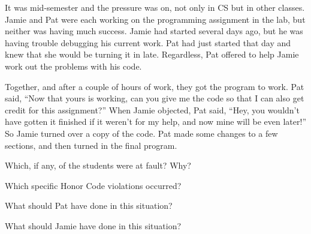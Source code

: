 
It was mid-semester and the pressure was on, not only in CS but in other classes.
Jamie and Pat were each working on the programming assignment in the lab, but neither was having much success.
Jamie had started several days ago, but he was having trouble debugging his current work.
Pat had just started that day and knew that she would be turning it in late.
Regardless, Pat offered to help Jamie work out the problems with his code.

\vspace{1em}

Together, and after a couple of hours of work, they got the program to work.
Pat said, ``Now that yours is working, can you give me the code so that I can also get credit for this assignment?''
When Jamie objected, Pat said, ``Hey, you wouldn't have gotten it finished if it weren't for my help, and now mine will be even later!''
So Jamie turned over a copy of the code.
Pat made some changes to a few sections, and then turned in the final program.




\Q Which, if any, of the students were at fault? Why?

\begin{answer}[6em]
\end{answer}


\Q Which specific Honor Code violations occurred?

\begin{answer}[6em]
\end{answer}


\Q What should Pat have done in this situation?

\begin{answer}[6em]
\end{answer}


\Q What should Jamie have done in this situation?

\begin{answer}[6em]
\end{answer}
